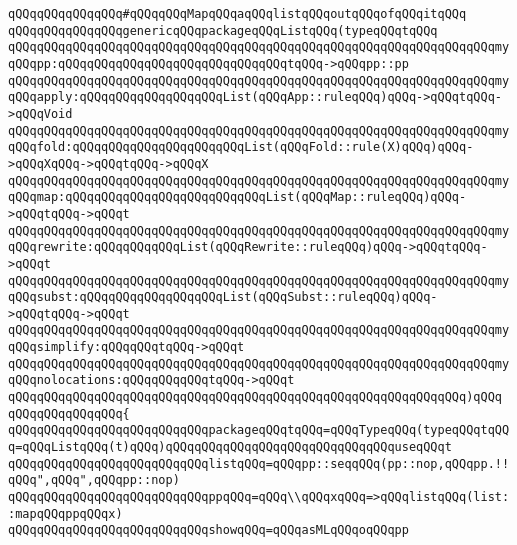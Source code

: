 \newline
\verb|qQQqqQQqqQQqqQQq#qQQqqQQqMapqQQqaqQQqlistqQQqoutqQQqofqQQqitqQQq|\newline
\verb|qQQqqQQqqQQqqQQqgenericqQQqpackageqQQqListqQQq(typeqQQqtqQQq|\newline
\verb|qQQqqQQqqQQqqQQqqQQqqQQqqQQqqQQqqQQqqQQqqQQqqQQqqQQqqQQqqQQqqQQqqQQqmyqQQqpp:qQQqqQQqqQQqqQQqqQQqqQQqqQQqqQQqtqQQq->qQQqpp::pp|\newline
\verb|qQQqqQQqqQQqqQQqqQQqqQQqqQQqqQQqqQQqqQQqqQQqqQQqqQQqqQQqqQQqqQQqqQQqmyqQQqapply:qQQqqQQqqQQqqQQqqQQqList(qQQqApp::ruleqQQq)qQQq->qQQqtqQQq->qQQqVoid|\newline
\verb|qQQqqQQqqQQqqQQqqQQqqQQqqQQqqQQqqQQqqQQqqQQqqQQqqQQqqQQqqQQqqQQqqQQqmyqQQqfold:qQQqqQQqqQQqqQQqqQQqqQQqList(qQQqFold::rule(X)qQQq)qQQq->qQQqXqQQq->qQQqtqQQq->qQQqX|\newline
\verb|qQQqqQQqqQQqqQQqqQQqqQQqqQQqqQQqqQQqqQQqqQQqqQQqqQQqqQQqqQQqqQQqqQQqmyqQQqmap:qQQqqQQqqQQqqQQqqQQqqQQqqQQqList(qQQqMap::ruleqQQq)qQQq->qQQqtqQQq->qQQqt|\newline
\verb|qQQqqQQqqQQqqQQqqQQqqQQqqQQqqQQqqQQqqQQqqQQqqQQqqQQqqQQqqQQqqQQqqQQqmyqQQqrewrite:qQQqqQQqqQQqList(qQQqRewrite::ruleqQQq)qQQq->qQQqtqQQq->qQQqt|\newline
\verb|qQQqqQQqqQQqqQQqqQQqqQQqqQQqqQQqqQQqqQQqqQQqqQQqqQQqqQQqqQQqqQQqqQQqmyqQQqsubst:qQQqqQQqqQQqqQQqqQQqList(qQQqSubst::ruleqQQq)qQQq->qQQqtqQQq->qQQqt|\newline
\verb|qQQqqQQqqQQqqQQqqQQqqQQqqQQqqQQqqQQqqQQqqQQqqQQqqQQqqQQqqQQqqQQqqQQqmyqQQqsimplify:qQQqqQQqtqQQq->qQQqt|\newline
\verb|qQQqqQQqqQQqqQQqqQQqqQQqqQQqqQQqqQQqqQQqqQQqqQQqqQQqqQQqqQQqqQQqqQQqmyqQQqnolocations:qQQqqQQqqQQqtqQQq->qQQqt|\newline
\verb|qQQqqQQqqQQqqQQqqQQqqQQqqQQqqQQqqQQqqQQqqQQqqQQqqQQqqQQqqQQqqQQq)qQQq|\newline
\verb|qQQqqQQqqQQqqQQq{|\newline
\verb|qQQqqQQqqQQqqQQqqQQqqQQqqQQqpackageqQQqtqQQq=qQQqTypeqQQq(typeqQQqtqQQq=qQQqListqQQq(t)qQQq)qQQqqQQqqQQqqQQqqQQqqQQqqQQqqQQquseqQQqt|\newline
\verb|qQQqqQQqqQQqqQQqqQQqqQQqqQQqlistqQQq=qQQqpp::seqqQQq(pp::nop,qQQqpp.!!qQQq",qQQq",qQQqpp::nop)|\newline
\verb|qQQqqQQqqQQqqQQqqQQqqQQqqQQqppqQQq=qQQq\\qQQqxqQQq=>qQQqlistqQQq(list::mapqQQqppqQQqx)|\newline
\verb|qQQqqQQqqQQqqQQqqQQqqQQqqQQqshowqQQq=qQQqasMLqQQqoqQQqpp|\newline
